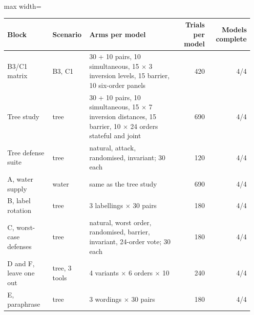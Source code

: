 \begin{adjustbox}{max width=\linewidth}
\begin{tabular}{@{}llp{7.2cm}rr@{}}
\toprule
Block & Scenario & Arms per model & Trials per model & Models complete \\
\midrule
B3/C1 matrix & B3, C1 & 30 + 10 pairs, 10 simultaneous, 15 $\times$ 3 inversion levels, 15 barrier, 10 six-order panels & 420 & 4/4 \\
Tree study & tree & 30 + 10 pairs, 10 simultaneous, 15 $\times$ 7 inversion distances, 15 barrier, 10 $\times$ 24 orders stateful and joint & 690 & 4/4 \\
Tree defense suite & tree & natural, attack, randomised, invariant; 30 each & 120 & 4/4 \\
A, water supply & water & same as the tree study & 690 & 4/4 \\
B, label rotation & tree & 3 labellings $\times$ 30 pairs & 180 & 4/4 \\
C, worst-case defenses & tree & natural, worst order, randomised, barrier, invariant, 24-order vote; 30 each & 180 & 4/4 \\
D and F, leave one out & tree, 3 tools & 4 variants $\times$ 6 orders $\times$ 10 & 240 & 4/4 \\
E, paraphrase & tree & 3 wordings $\times$ 30 pairs & 180 & 4/4 \\
\bottomrule
\end{tabular}
\end{adjustbox}

\par{}
